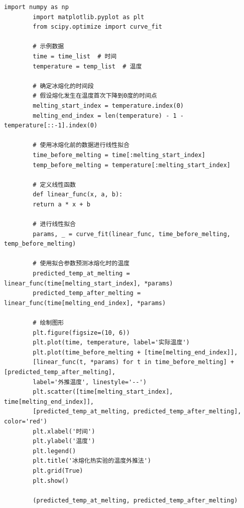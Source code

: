 \documentclass[dvipsnames, svgnames,a4paper,11pt]{article}
\begin{document}
	\begin{lstlisting}[style=pythonstyle,caption=外推法]
		import numpy as np
		import matplotlib.pyplot as plt
		from scipy.optimize import curve_fit
		
		# 示例数据
		time = time_list  # 时间
		temperature = temp_list  # 温度
		
		# 确定冰熔化的时间段
		# 假设熔化发生在温度首次下降到0度的时间点
		melting_start_index = temperature.index(0)
		melting_end_index = len(temperature) - 1 - temperature[::-1].index(0)
		
		# 使用冰熔化前的数据进行线性拟合
		time_before_melting = time[:melting_start_index]
		temp_before_melting = temperature[:melting_start_index]
		
		# 定义线性函数
		def linear_func(x, a, b):
		return a * x + b
		
		# 进行线性拟合
		params, _ = curve_fit(linear_func, time_before_melting, temp_before_melting)
		
		# 使用拟合参数预测冰熔化时的温度
		predicted_temp_at_melting = linear_func(time[melting_start_index], *params)
		predicted_temp_after_melting = linear_func(time[melting_end_index], *params)
		
		# 绘制图形
		plt.figure(figsize=(10, 6))
		plt.plot(time, temperature, label='实际温度')
		plt.plot(time_before_melting + [time[melting_end_index]], 
		[linear_func(t, *params) for t in time_before_melting] + [predicted_temp_after_melting],
		label='外推温度', linestyle='--')
		plt.scatter([time[melting_start_index], time[melting_end_index]], 
		[predicted_temp_at_melting, predicted_temp_after_melting], color='red')
		plt.xlabel('时间')
		plt.ylabel('温度')
		plt.legend()
		plt.title('冰熔化热实验的温度外推法')
		plt.grid(True)
		plt.show()
		
		(predicted_temp_at_melting, predicted_temp_after_melting)
	\end{lstlisting}
\end{document}
